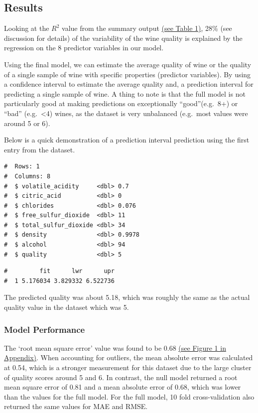 \documentclass[a4paper,9pt,twocolumn,twoside,]{pinp}
\begin{document}
\hypertarget{results}{%
\subsection{Results}\label{results}}

Looking at the \(R^2\) value from the summary output
\hyperref[table-1]{(see Table 1)}, 28\% (see discussion for details) of
the variability of the wine quality is explained by the regression on
the 8 predictor variables in our model.

Using the final model, we can estimate the average quality of wine or
the quality of a single sample of wine with specific properties
(predictor variables). By using a confidence interval to estimate the
average quality and, a prediction interval for predicting a single
sample of wine. A thing to note is that the full model is not
particularly good at making predictions on exceptionally
``good''(e.g.~8+) or ``bad'' (e.g.~\textless4) wines, as the dataset is
very unbalanced (e.g.~most values were around 5 or 6).

Below is a quick demonstration of a prediction interval prediction using
the first entry from the dataset.

\begin{ShadedResult}
\begin{verbatim}
#  Rows: 1
#  Columns: 8
#  $ volatile_acidity     <dbl> 0.7
#  $ citric_acid          <dbl> 0
#  $ chlorides            <dbl> 0.076
#  $ free_sulfur_dioxide  <dbl> 11
#  $ total_sulfur_dioxide <dbl> 34
#  $ density              <dbl> 0.9978
#  $ alcohol              <dbl> 94
#  $ quality              <dbl> 5
\end{verbatim}
\end{ShadedResult}
\begin{ShadedResult}
\begin{verbatim}
#         fit      lwr      upr
#  1 5.176034 3.829332 6.522736
\end{verbatim}
\end{ShadedResult}

The predicted quality was about 5.18, which was roughly the same as the
actual quality value in the dataset which was 5.

\hypertarget{model-performance}{%
\subsubsection{Model Performance}\label{model-performance}}

The `root mean square error' value was found to be 0.68
\hyperref[figure-1]{(see Figure 1 in Appendix)}. When accounting for
outliers, the mean absolute error was calculated at 0.54, which is a
stronger measurement for this dataset due to the large cluster of
quality scores around 5 and 6. In contrast, the null model returned a
root mean square error of 0.81 and a mean absolute error of 0.68, which
was lower than the values for the full model. For the full model, 10
fold cross-validation also returned the same values for MAE and RMSE.
\end{document}
